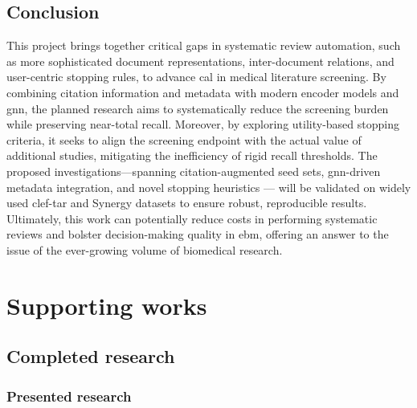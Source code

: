 \documentclass[10pt,oneside]{book}
\begin{document}
\section{Conclusion}

 This project brings together critical gaps in systematic review automation, such as more sophisticated document representations, inter-document relations, and user-centric stopping rules, to advance \gls*{cal} in medical literature screening. By combining citation information and metadata with modern encoder models and \gls*{gnn}, the planned research aims to systematically reduce the screening burden while preserving near-total recall. Moreover, by exploring utility-based stopping criteria, it seeks to align the screening endpoint with the actual value of additional studies, mitigating the inefficiency of rigid recall thresholds. The proposed investigations—spanning citation-augmented seed sets, \gls*{gnn}-driven metadata integration, and novel stopping heuristics — will be validated on widely used \gls*{clef}-\gls*{tar} and Synergy datasets to ensure robust, reproducible results. Ultimately, this work can potentially reduce costs in performing systematic reviews and bolster decision-making quality in \gls*{ebm}, offering an answer to the issue of the ever-growing volume of biomedical research.


\chapter{Supporting works}

\section{Completed research}

\subsection{Presented research}
\end{document}

